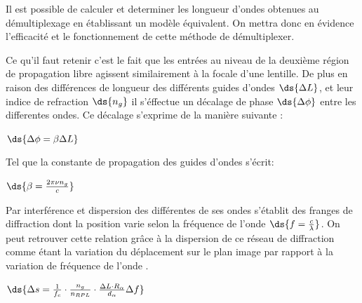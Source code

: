 \documentclass[oneside]{book}
\begin{document}

			Il est possible de calculer et determiner les longueur d'ondes obtenues au démultiplexage en établissant un modèle équivalent. On mettra donc en évidence l'efficacité et le fonctionnement de cette méthode de démultiplexer.  

			\begin{figure}[ht!]
				\begin{floatrow}
					
				\end{floatrow}
				\end{figure}

			Ce qu'il faut retenir c'est le fait que les entrées au niveau de la deuxième région de propagation libre agissent similairement à la focale d'une lentille\cite{awg lens}. De plus en raison des différences de longueur des différents guides d'ondes $\ds{\Delta L}$, et leur indice de refraction $\ds{n_g}$ il s'éffectue un décalage de phase $\ds{\Delta \phi}$ entre les differentes ondes. Ce décalage s'exprime de la manière suivante\cite{awg dephase} : \\
			\centerline{$\ds{\Delta \phi= \beta \Delta L}$}
			
			Tel que la constante de propagation des guides d'ondes s'écrit: \\
			\centerline{$\ds{\beta = \frac{2\pi\nu n_{g}}{c}}$}
			
			Par interférence et dispersion des différentes de ses ondes s'établit des franges de diffraction dont la position varie selon la fréquence de l'onde $\ds{f= \frac{c}{\lambda } }$. 
			On peut retrouver cette relation grâce à la dispersion de ce réseau de diffraction comme étant la variation du déplacement sur le plan image par rapport à la variation de fréquence de l'onde \cite{awg dephase}. \\
			\centerline{$\ds{\Delta s = \frac{1}{f_c}\cdot \frac{n_g}{n_{RPL}}\cdot \frac{\Delta L\cdot  R_\alpha }{d_\alpha}\Delta f}$}
\end{document}
